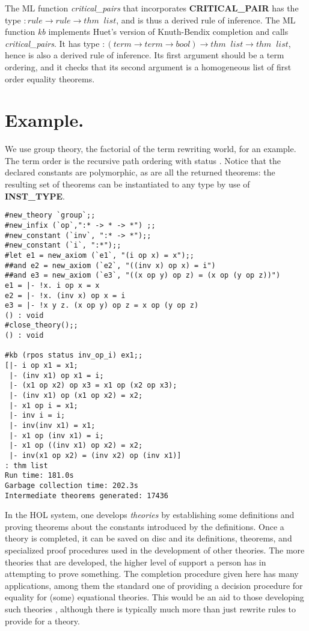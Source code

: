 The ML function {\em critical\_pairs} that incorporates {\bf CRITICAL\_PAIR}
has the type $:rule \rightarrow rule \rightarrow thm \;\; list$, and is thus a
derived rule of inference. The ML function {\em kb} implements Huet's version
of Knuth-Bendix completion \cite{huet81} and calls {\em critical\_pairs}. It
has type $:(term \rightarrow term \rightarrow bool) \rightarrow thm \;\; list
\rightarrow thm \;\; list$, hence is also a derived rule of inference. Its
first argument should be a term ordering, and it checks that its second
argument is a homogeneous list of first order equality theorems.


\section{Example.}

We use group theory, the factorial of the term rewriting world, for an example.
The term order is the recursive path ordering with status \cite{dersh87}.
Notice that the declared constants are polymorphic, as are all the returned
theorems: the resulting set of theorems can be instantiated to any type by use
of {\bf INST\_TYPE}.

\begin{verbatim}
#new_theory `group`;;
#new_infix (`op`,":* -> * -> *") ;;
#new_constant (`inv`, ":* -> *");;
#new_constant (`i`, ":*");;
#let e1 = new_axiom (`e1`, "(i op x) = x");;
##and e2 = new_axiom (`e2`, "((inv x) op x) = i")
##and e3 = new_axiom (`e3`, "((x op y) op z) = (x op (y op z))")
e1 = |- !x. i op x = x
e2 = |- !x. (inv x) op x = i
e3 = |- !x y z. (x op y) op z = x op (y op z)
() : void
#close_theory();;
() : void

#kb (rpos status inv_op_i) ex1;;
[|- i op x1 = x1;
 |- (inv x1) op x1 = i;
 |- (x1 op x2) op x3 = x1 op (x2 op x3);
 |- (inv x1) op (x1 op x2) = x2;
 |- x1 op i = x1;
 |- inv i = i;
 |- inv(inv x1) = x1;
 |- x1 op (inv x1) = i;
 |- x1 op ((inv x1) op x2) = x2;
 |- inv(x1 op x2) = (inv x2) op (inv x1)]
: thm list
Run time: 181.0s
Garbage collection time: 202.3s
Intermediate theorems generated: 17436

\end{verbatim}

In the HOL system, one develops {\em theories} by establishing some definitions
and proving theorems about the constants introduced by the definitions. Once a
theory is completed, it can be saved on disc and its definitions, theorems, and
specialized proof procedures used in the development of other theories. The
more theories that are developed, the higher level of support a person has in
attempting to prove something. The completion procedure given here has many
applications, among them the standard one of providing a decision procedure for
equality for (some) equational theories. This would be an aid to those
developing such theories \cite{gunter89}, although there is typically much more
than just rewrite rules to provide for a theory.


